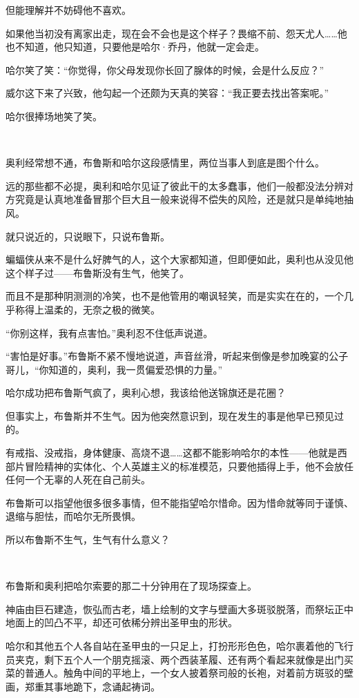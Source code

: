 \documentclass[../main]{subfiles}
\begin{document}
但能理解并不妨碍他不喜欢。

如果他当初没有离家出走，现在会不会也是这个样子？畏缩不前、怨天尤人……他也不知道，他只知道，只要他是哈尔·乔丹，他就一定会走。

哈尔笑了笑：“你觉得，你父母发现你长回了腺体的时候，会是什么反应？”

威尔这下来了兴致，他勾起一个还颇为天真的笑容：“我正要去找出答案呢。”

哈尔很捧场地笑了笑。

~\

奥利经常想不通，布鲁斯和哈尔这段感情里，两位当事人到底是图个什么。

远的那些都不必提，奥利和哈尔见证了彼此干的太多蠢事，他们一般都没法分辨对方究竟是认真地准备冒那个巨大且一般来说得不偿失的风险，还是就只是单纯地抽风。

就只说近的，只说眼下，只说布鲁斯。

蝙蝠侠从来不是什么好脾气的人，这个大家都知道，但即便如此，奥利也从没见他这个样子过——布鲁斯没有生气，他笑了。

而且不是那种阴测测的冷笑，也不是他管用的嘲讽轻笑，而是实实在在的，一个几乎称得上温柔的，无奈之极的微笑。

“你别这样，我有点害怕。”奥利忍不住低声说道。

“害怕是好事。”布鲁斯不紧不慢地说道，声音丝滑，听起来倒像是参加晚宴的公子哥儿，“你知道的，奥利，我一贯偏爱恐惧的力量。”

哈尔成功把布鲁斯气疯了，奥利心想，我该给他送锦旗还是花圈？

但事实上，布鲁斯并不生气。因为他突然意识到，现在发生的事是他早已预见过的。

有戒指、没戒指，身体健康、高烧不退……这都不能影响哈尔的本性——他就是西部片冒险精神的实体化、个人英雄主义的标准模范，只要他插得上手，他不会放任任何一个无辜的人死在自己前头。

布鲁斯可以指望他很多很多事情，但不能指望哈尔惜命。因为惜命就等同于谨慎、退缩与胆怯，而哈尔无所畏惧。

所以布鲁斯不生气，生气有什么意义？

~\

布鲁斯和奥利把哈尔索要的那二十分钟用在了现场探查上。

神庙由巨石建造，恢弘而古老，墙上绘制的文字与壁画大多斑驳脱落，而祭坛正中地面上的凹凸不平，却还可依稀分辨出圣甲虫的形状。

哈尔和其他五个人各自站在圣甲虫的一只足上，打扮形形色色，哈尔裹着他的飞行员夹克，剩下五个人一个朋克摇滚、两个西装革履、还有两个看起来就像是出门买菜的普通人。触角中间的平地上，一个女人披着祭司般的长袍，对着前方斑驳的壁画，郑重其事地跪下，念诵起祷词。
\end{document}
